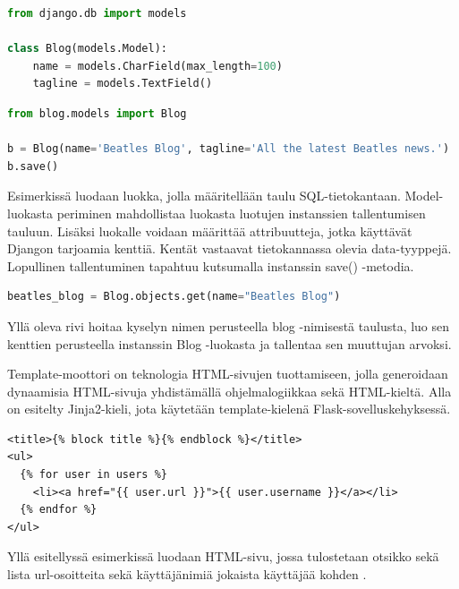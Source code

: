 \documentclass[utf8]{gradu3}
\begin{document}
\begin{lstlisting}[language=Python]
from django.db import models

class Blog(models.Model):
    name = models.CharField(max_length=100)
    tagline = models.TextField()
\end{lstlisting}

\begin{lstlisting}[language=Python]
from blog.models import Blog

b = Blog(name='Beatles Blog', tagline='All the latest Beatles news.')
b.save()
\end{lstlisting}

Esimerkissä luodaan luokka, jolla määritellään taulu SQL-tietokantaan. Model-luokasta periminen mahdollistaa luokasta luotujen instanssien tallentumisen tauluun. Lisäksi
luokalle voidaan määrittää attribuutteja, jotka käyttävät Djangon tarjoamia kenttiä. Kentät vastaavat tietokannassa olevia data-tyyppejä. Lopullinen tallentuminen
tapahtuu kutsumalla instanssin save() -metodia.


\begin{lstlisting}[language=Python]
beatles_blog = Blog.objects.get(name="Beatles Blog")
\end{lstlisting}

Yllä oleva rivi hoitaa kyselyn nimen perusteella blog -nimisestä taulusta, luo sen kenttien perusteella instanssin Blog -luokasta ja tallentaa sen muuttujan arvoksi.


Template-moottori on teknologia HTML-sivujen tuottamiseen, jolla generoidaan dynaamisia HTML-sivuja yhdistämällä ohjelmalogiikkaa sekä HTML-kieltä. Alla on esitelty Jinja2-kieli, jota käytetään template-kielenä Flask-sovelluskehyksessä.
\pagebreak

\begin{lstlisting}[language=Smalltalk]
<title>{% block title %}{% endblock %}</title>
<ul>
  {% for user in users %}
	<li><a href="{{ user.url }}">{{ user.username }}</a></li>
  {% endfor %}
</ul>
\end{lstlisting}

Yllä esitellyssä esimerkissä luodaan HTML-sivu, jossa tulostetaan otsikko sekä lista url-osoitteita sekä käyttäjänimiä jokaista käyttäjää kohden \parencite{jinja}.
\end{document}
